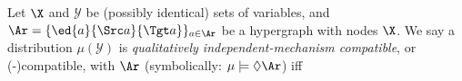 \begin{defn}[\scibility]
        \label{defn:scompat}
    Let $\X$ and $\mathcal Y$ be (possibly identical) sets of variables, and
    $\Ar = \{ \ed{a}{\Src a}{\Tgt a} \}_{a \in \Ar}$ be a hypergraph with 
    nodes $\X$.    
    We say a distribution $\mu(\mathcal Y)$ is
    \emph{%
        qualitatively
        independent-mechanism compatible}, or (\SQIM-)compatible,
    with $\Ar$
    (symbolically: $\mu \models \Diamond \Ar$)
    iff

\end{defn}
